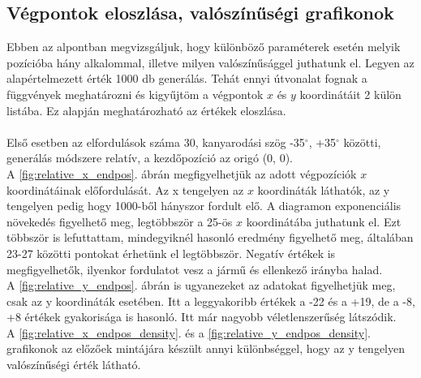 \newpage
\subsection{Végpontok eloszlása, valószínűségi grafikonok}

Ebben az alpontban megvizsgáljuk, hogy különböző paraméterek esetén melyik pozícióba hány alkalommal, illetve milyen valószínűsággel juthatunk el. Legyen az alapértelmezett érték 1000 db generálás. Tehát ennyi útvonalat fognak a függvények meghatározni és kigyűjtöm a végpontok $ x $ és $ y $ koordinátáit 2 külön listába. Ez alapján meghatározható az értékek eloszlása.\\\\
Első esetben az elfordulások száma 30, kanyarodási szög -35$^{\circ}$, +35$^{\circ}$ közötti, generálás módszere relatív, a kezdőpozíció az origó (0, 0).\\

A \ref{fig:relative_x_endpos}. ábrán megfigyelhetjük az adott végpozíciók $ x $ koordinátáinak előfordulását. Az x tengelyen az $ x $ koordináták láthatók, az y tengelyen pedig hogy 1000-ből hányszor fordult elő. A diagramon exponenciális növekedés figyelhető meg, legtöbbször a 25-ös $ x $ koordinátába juthatunk el. Ezt többször is lefuttattam, mindegyiknél hasonló eredmény figyelhető meg, általában 23-27 közötti pontokat érhetünk el legtöbbször. Negatív értékek is megfigyelhetők, ilyenkor fordulatot vesz a jármű és ellenkező irányba halad.\\

A \ref{fig:relative_y_endpos}. ábrán is ugyanezeket az adatokat figyelhetjük meg, csak az y koordináták esetében. Itt a leggyakoribb értékek a -22 és a +19, de a -8, +8 értékek gyakorisága is hasonló. Itt már nagyobb véletlenszerűség látszódik.\\

A \ref{fig:relative_x_endpos_density}. és a \ref{fig:relative_y_endpos_density}. grafikonok az előzőek mintájára készült annyi különbséggel, hogy az y tengelyen valószínűségi érték látható.
\newpage 



